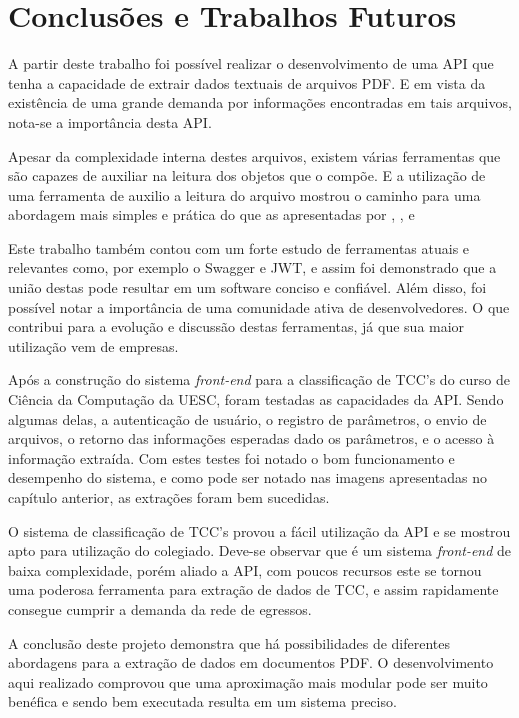 \chapter{Conclusões e Trabalhos Futuros}

A partir deste trabalho foi possível realizar o desenvolvimento de uma API que tenha a capacidade de extrair dados textuais de arquivos PDF. E em vista da existência de uma grande demanda por informações encontradas em tais arquivos, nota-se a importância desta API.

Apesar da complexidade interna destes arquivos, existem várias ferramentas que são capazes de auxiliar na leitura dos objetos que o compõe. E a utilização de uma ferramenta de auxilio a leitura do arquivo mostrou o caminho para uma abordagem mais simples e prática do que as apresentadas por \citeauthor{sasirekhatext}, \citeauthor{ajedig2011pdf}, \citeauthor{marinai2009metadata} e \citeauthor{lin2011mathematical}

Este trabalho também contou com um forte estudo de ferramentas atuais e relevantes como, por exemplo o Swagger e JWT, e assim foi demonstrado que a união destas pode resultar em um software conciso e confiável. Além disso, foi possível notar a importância de uma comunidade ativa de desenvolvedores. O que contribui para a evolução e discussão destas ferramentas, já que sua maior utilização vem de empresas.

Após a construção do sistema \textit{front-end} para a classificação de TCC's do curso de Ciência da Computação da UESC, foram testadas as capacidades da API. Sendo algumas delas, a autenticação de usuário, o registro de parâmetros, o envio de arquivos, o retorno das informações esperadas dado os parâmetros, e o acesso à informação extraída.
Com estes testes foi notado o bom funcionamento e desempenho do sistema, e como pode ser notado nas imagens apresentadas no capítulo anterior, as extrações foram bem sucedidas. 

O sistema de classificação de TCC's provou a fácil utilização da API e se mostrou apto para utilização do colegiado. Deve-se observar que é um sistema \textit{front-end} de baixa complexidade, porém aliado a API, com poucos recursos este se tornou uma poderosa ferramenta para extração de dados de TCC, e assim rapidamente consegue cumprir a demanda da rede de egressos.

A conclusão deste projeto demonstra que há possibilidades de diferentes abordagens para a extração de dados em documentos PDF. O desenvolvimento aqui realizado comprovou que uma aproximação mais modular pode ser muito benéfica e sendo bem executada resulta em um sistema preciso.

